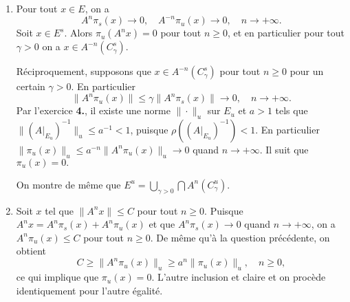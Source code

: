 \documentclass[a4paper,12pt,openany]{article}
\theoremstyle{plain}
\theoremstyle{definition}
\begin{document}
\vspace{0.6cm}


\begin{enumerate}
\item Pour tout $x \in E$, on a 
$$
A^{n} \pi_s(x) \to 0, \quad A^{-n} \pi_u(x) \to 0, \quad n \to +\infty.
$$
Soit $x \in E^s$. Alors $\pi_u(A^n x) = 0$ pour tout $n \geq 0$, et en particulier pour tout $\gamma > 0$ on a $x \in A^{-n}(C^s_\gamma).$ \vspace{0.2cm}

\noindent R\'eciproquement, supposons que $x \in A^{-n}(C^s_\gamma)$ pour tout $n \geq 0$ pour un certain $\gamma > 0$. En particulier
$$
\|A^n\pi_u(x)\|\leq \gamma \|A^n \pi_s(x)\| \to 0, \quad n \to +\infty.
$$
Par l'exercice \textbf{4.}, il existe une norme $\|\cdot\|_u$ sur $E_u$ et $a > 1$ tels que $\|(A|_{E_u})^{-1}\|_u \leq a^{-1} < 1$, puisque $\rho((A|_{E_u})^{-1}) < 1.$ En particulier $\|\pi_u(x)\|_u \leq a^{-n} \|A^n \pi_u(x)\|_u \to 0$ quand $n \to +\infty$. Il suit que $\pi_u(x) = 0.$

\vspace{0.2cm}
\noindent On montre de m\^eme que $E^u = \bigcup_{\gamma > 0} \bigcap A^n(C^u_\gamma).$

\item Soit $x$ tel que  $\|A^nx\| \leq C$ pour tout $n \geq 0$. Puisque $A^nx = A^n\pi_s(x) + A^n\pi_u(x)$ et que $A^n\pi_s(x) \to 0$ quand $n \to +\infty$, on a $A^n \pi_u(x) \leq C$ pour tout $n \geq 0$. De m\^eme qu'\`a la question pr\'ec\'edente, on obtient
$$
 C \geq \| A^n \pi_u(x)\|_u \geq a^n \|\pi_u(x)\|_u, \quad n \geq 0,
$$
ce qui implique que $\pi_u(x) = 0$. L'autre inclusion et claire et on proc\`ede identiquement pour l'autre \'egalit\'e.
\end{enumerate}
\vspace{0.6cm}

\end{document}
